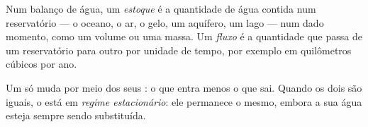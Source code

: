 \begin{definition}\label{def:g10:freshwater-resources:stock}
Num balanço de água, um \emph{estoque} é a quantidade de
água contida num reservatório --- o oceano, o ar, o gelo, um aquífero, um
lago --- num dado momento, como um volume ou uma massa. Um
\emph{fluxo} é a quantidade que passa de um reservatório para
outro por unidade de tempo, por exemplo em quilômetros cúbicos por ano.
\end{definition}

Um  só muda por meio dos seus : o que entra menos o que sai.
Quando os dois são iguais, o  está em \emph{regime estacionário}: ele
permanece o mesmo, embora a sua água esteja sempre sendo substituída.

